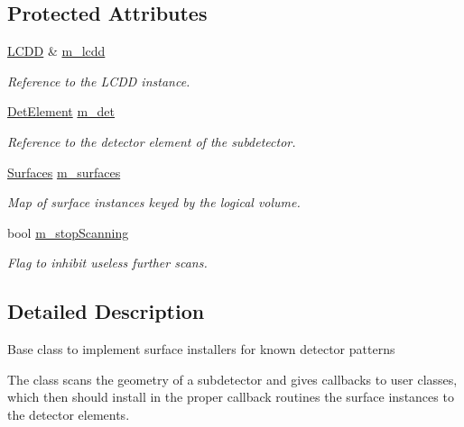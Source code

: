 \subsection*{Protected Attributes}
\begin{DoxyCompactItemize}
\item 
\hyperlink{class_d_d4hep_1_1_geometry_1_1_l_c_d_d}{LCDD} \& \hyperlink{class_d_d4hep_1_1_surface_installer_a557d1f8fd057ae637f855dca603ebaf9}{m\_\-lcdd}
\begin{DoxyCompactList}\small\item\em Reference to the LCDD instance. \item\end{DoxyCompactList}\item 
\hyperlink{class_d_d4hep_1_1_geometry_1_1_det_element}{DetElement} \hyperlink{class_d_d4hep_1_1_surface_installer_a8a8f3acac5b96cd94464d886e06bf6df}{m\_\-det}
\begin{DoxyCompactList}\small\item\em Reference to the detector element of the subdetector. \item\end{DoxyCompactList}\item 
\hyperlink{class_d_d4hep_1_1_surface_installer_a16346209b86955ff4a4a380c3ce1bcd2}{Surfaces} \hyperlink{class_d_d4hep_1_1_surface_installer_aa301ec142bb36afc171389e0e8acabd2}{m\_\-surfaces}
\begin{DoxyCompactList}\small\item\em Map of surface instances keyed by the logical volume. \item\end{DoxyCompactList}\item 
bool \hyperlink{class_d_d4hep_1_1_surface_installer_ab8193ffcef2d5b522aba8d594a2da412}{m\_\-stopScanning}
\begin{DoxyCompactList}\small\item\em Flag to inhibit useless further scans. \item\end{DoxyCompactList}\end{DoxyCompactItemize}


\subsection{Detailed Description}
Base class to implement surface installers for known detector patterns

The class scans the geometry of a subdetector and gives callbacks to user classes, which then should install in the proper callback routines the surface instances to the detector elements.

